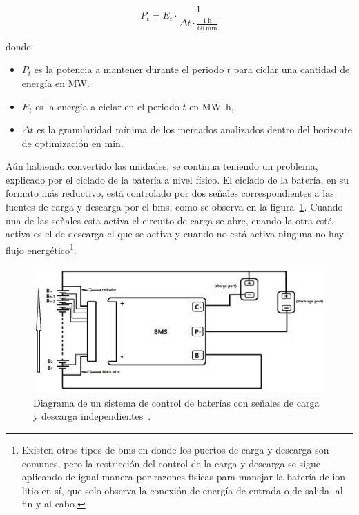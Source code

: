 \begin{samepage}

  \begin{equation}
    \label{eq:energia-a-potencia}
    P_{t} = E_{t} \cdot \frac{1}{\Delta t \cdot \frac{\SI{1}{\hour}}{\SI{60}{\minute}}}
  \end{equation}

  donde

  \begin{itemize}

    \item \( P_{t} \) es la potencia a mantener durante el periodo \( t \) para ciclar una cantidad de energía en \si{\mega\watt}.

    \item \( E_{t} \) es la energía a ciclar en el periodo \( t \) en \si{{\mega\watt\hour}},

    \item \( \Delta t \) es la granularidad mínima de los mercados analizados dentro del horizonte de optimización en \si{\minute}.

  \end{itemize}

\end{samepage}

Aún habiendo convertido las unidades, se continua teniendo un problema, explicado por el ciclado de la batería a nivel físico. El ciclado de la batería, en su formato más reductivo, está controlado por dos señales correspondientes a las fuentes de carga y descarga por el \gls{bms}, como se observa en la figura~\ref{fig:carga-descarga}. Cuando una de las señales esta activa el circuito de carga se abre, cuando la otra está activa es el de descarga el que se activa y cuando no está activa ninguna no hay flujo energético\footnote{Existen otros tipos de \gls{bms} en donde los puertos de carga y descarga son comunes, pero la restricción del control de la carga y descarga se sigue aplicando de igual manera por razones físicas para manejar la batería de ion-litio en sí, que solo observa la conexión de energía de entrada o de salida, al fin y al cabo.}.

\begin{figure}
  \centering
  \includegraphics[width=0.75\linewidth]{figures/carga-descarga.png}
  \caption[Diagrama de un sistema de control de baterías.]{Diagrama de un sistema de control de baterías con señales de carga y descarga independientes~\cite{sunkko2025two}.}
  \label{fig:carga-descarga}
\end{figure}

